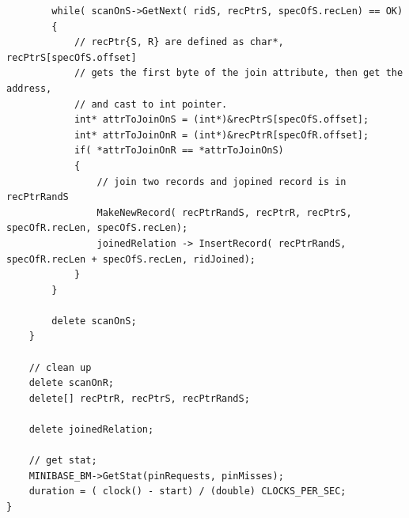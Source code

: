 \documentclass{article}
\begin{document}
\begin{lstlisting}
		while( scanOnS->GetNext( ridS, recPtrS, specOfS.recLen) == OK)
		{
			// recPtr{S, R} are defined as char*, recPtrS[specOfS.offset] 
			// gets the first byte of the join attribute, then get the address, 
			// and cast to int pointer.
			int* attrToJoinOnS = (int*)&recPtrS[specOfS.offset];
			int* attrToJoinOnR = (int*)&recPtrR[specOfR.offset];
			if( *attrToJoinOnR == *attrToJoinOnS)
			{
				// join two records and jopined record is in recPtrRandS
				MakeNewRecord( recPtrRandS, recPtrR, recPtrS, specOfR.recLen, specOfS.recLen);	
				joinedRelation -> InsertRecord( recPtrRandS, specOfR.recLen + specOfS.recLen, ridJoined);
			}
		}

		delete scanOnS;
	}

	// clean up
	delete scanOnR;
	delete[] recPtrR, recPtrS, recPtrRandS;

	delete joinedRelation;

	// get stat;
	MINIBASE_BM->GetStat(pinRequests, pinMisses);
	duration = ( clock() - start) / (double) CLOCKS_PER_SEC;
}
\end{lstlisting}

\newpage
\end{document}
